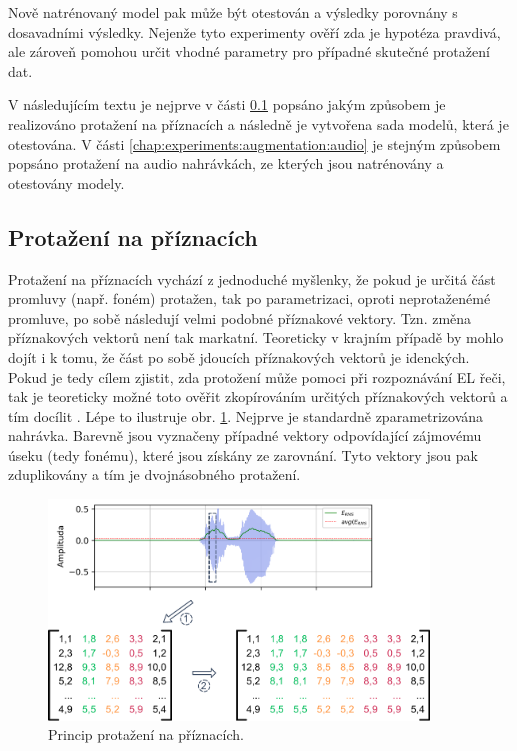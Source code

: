 \noindent Nově natrénovaný model pak může být otestován a výsledky porovnány s dosavadními výsledky. Nejenže tyto experimenty ověří zda je hypotéza pravdivá, ale zároveň pomohou určit vhodné parametry pro případné skutečné protažení dat.

V následujícím textu je nejprve v části \ref{chap:experiments:augmentation:features} popsáno jakým způsobem je realizováno protažení na příznacích a následně je vytvořena sada modelů, která je otestována. V části \ref{chap:experiments:augmentation:audio} je stejným způsobem popsáno protažení na audio nahrávkách, ze kterých jsou natrénovány a otestovány modely.

\subsection{Protažení na příznacích}
\label{chap:experiments:augmentation:features}

Protažení na příznacích vychází z jednoduché myšlenky, že pokud je určitá část promluvy (např. foném) protažen, tak po parametrizaci, oproti neprotaženémé promluve, po sobě následují velmi podobné příznakové vektory. Tzn. změna příznakových vektorů není tak markatní. Teoreticky v krajním případě by mohlo dojít i k tomu, že část po sobě jdoucích příznakových vektorů je idenckých. Pokud je tedy cílem zjistit, zda protožení může pomoci při rozpoznávání EL řeči, tak je teoreticky možné toto ověřit zkopírováním určitých příznakových vektorů a tím docílit . Lépe to ilustruje obr. \ref{fig:experiments:augmentation:features}. Nejprve je standardně zparametrizována nahrávka. Barevně jsou vyznačeny případné vektory odpovídající zájmovému úseku (tedy fonému), které jsou získány ze zarovnání. Tyto vektory jsou pak zduplikovány a tím je  dvojnásobného protažení.

\begin{figure}[hbpt]
  \centering
  \includegraphics[width=0.9\textwidth]{./ch4-experiments/img/augmentation_features.pdf}
  \caption{Princip protažení na příznacích.}
  \label{fig:experiments:augmentation:features}
\end{figure}

